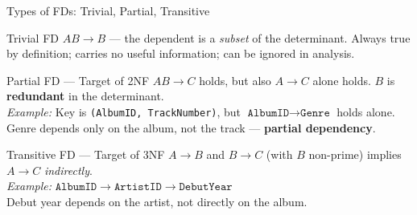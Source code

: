 \begin{frame}{Types of FDs: Trivial, Partial, Transitive}
  \begin{block}{Trivial FD}
    $AB \to B$ --- the dependent is a \emph{subset} of the determinant.
    Always true by definition; carries no useful information; can be ignored in
    analysis.
  \end{block}

  \begin{block}{Partial FD --- Target of 2NF}
    $AB \to C$ holds, but also $A \to C$ alone holds.
    $B$ is \textbf{redundant} in the determinant.\\[2pt]
    \textit{Example:} Key is \texttt{(AlbumID, TrackNumber)}, but
    $\texttt{AlbumID} \to \texttt{Genre}$ holds alone.\\
    Genre depends only on the album, not the track --- \textbf{partial dependency}.
  \end{block}

  \begin{block}{Transitive FD --- Target of 3NF}
    $A \to B$ and $B \to C$ (with $B$ non-prime) implies $A \to C$
    \emph{indirectly}.\\[2pt]
    \textit{Example:}
    $\texttt{AlbumID} \to \texttt{ArtistID} \to \texttt{DebutYear}$\\
    Debut year depends on the artist, not directly on the album.
  \end{block}
\end{frame}

